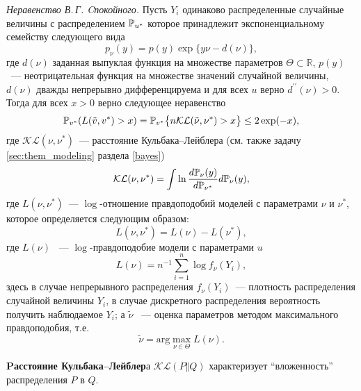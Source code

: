 \begin{remark}
{\it Неравенство В.\,Г. Cпокойного.}  
Пусть $Y_i$ одинаково распределенные случайные величины с распределением $\mathrm{{\mathbb P}}_{u^{*}}$ которое принадлежит экспоненциальному семейству следующего вида
\begin{equation*}
p_{\nu}(y) = p(y)\exp\{y\nu-d(\nu)\},
\end{equation*}
где $d(\nu)$ заданная выпуклая функция на множестве параметров $\Theta\subset \mathbb{R}$, $p(y)$ ~--- неотрицательная функция на множестве значений случайной величины, $d(\nu)$ дважды непрерывно дифференцируема и для всех $u$ верно $d^{\prime\prime}(\nu)>0$.
Тогда для всех $x>0$ верно следующее неравенство
\begin{equation*}
\mathrm{{\mathbb P}}_{v^{*}}(L(\tilde{v},v^{*})>x) = \mathrm{{\mathbb P}}_{v^{*}}\bigl\{n\mathcal{KL}(\tilde{\nu},\nu^{*})> x\bigr\}\leq 2\exp(-x),
\end{equation*}
где $\mathcal{KL}(\nu,\nu^{*})$~--- расстояние Кульбака--Лейблера (см. также задачу \ref{sec:them_modeling} раздела \ref{bayes})
\begin{equation*}
\mathcal{KL}(\nu,\nu^{*}) = \int \ln\frac{d\mathrm{{\mathbb P}}_{\nu}(y)}{d\mathrm{{\mathbb P}}_{\nu^{*}}}d\mathrm{{\mathbb P}}_{\nu}(y),
\end{equation*} 
где $L(\nu,\nu^{*})$~--- $\log$-отношение правдоподобий моделей с параметрами $\nu$ и $\nu^{*}$, которое определяется следующим образом:
\begin{equation*}
L(\nu,\nu^{*}) = L(\nu)-L(\nu^{*}),
\end{equation*}
где $L(\nu)$ ~---  $\log$-правдоподобие модели с параметрами $u$ 
\begin{equation*}
L(\nu) = n^{-1}\sum_{i=1}^n\log f_\nu(Y_i),
\end{equation*}
здесь в случае непрерывного распределения $f_\nu(Y_i)$~--- плотность распределения  случайной величины $Y_i$, в случае дискретного распределения  вероятность получить наблюдаемое $Y_i$; а 
$\tilde{\nu}$ ~--- оценка параметров методом максимального правдоподобия, т.е.
\begin{equation*}
\tilde{\nu} = \mathrm{arg}\max_{\nu\in \Theta}L(\nu).
\end{equation*}

\medskip

\textbf{Pасстояние Кульбака--Лейблер}а $\mathcal{KL}(P \Vert Q)$ характеризует ``вложенность'' распределения $P$ в $Q$.


\end{remark}
